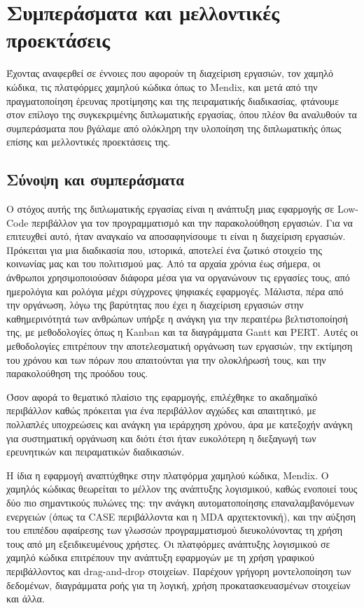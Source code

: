 \chapter{Συμπεράσματα και μελλοντικές προεκτάσεις}
    Έχοντας αναφερθεί σε έννοιες που αφορούν τη διαχείριση εργασιών, τον χαμηλό κώδικα, τις πλατφόρμες χαμηλού κώδικα όπως το Mendix, και μετά από την πραγματοποίηση έρευνας προτίμησης και της πειραματικής διαδικασίας, φτάνουμε στον επίλογο της συγκεκριμένης διπλωματικής εργασίας, όπου πλέον θα αναλυθούν τα συμπεράσματα που βγάλαμε από ολόκληρη την υλοποίηση της διπλωματικής όπως επίσης και μελλοντικές προεκτάσεις της.

    \section{Σύνοψη και συμπεράσματα}
        Ο στόχος αυτής της διπλωματικής εργασίας είναι η ανάπτυξη μιας εφαρμογής σε Low-Code περιβάλλον για τον προγραμματισμό και την παρακολούθηση εργασιών. Για να επιτευχθεί αυτό, ήταν αναγκαίο να αποσαφηνίσουμε τι είναι η διαχείριση εργασιών. Πρόκειται για μια διαδικασία που, ιστορικά, αποτελεί ένα ζωτικό στοιχείο της κοινωνίας μας και του πολιτισμού μας. Από τα αρχαία χρόνια έως σήμερα, οι άνθρωποι χρησιμοποιούσαν διάφορα μέσα για να οργανώνουν τις εργασίες τους, από ημερολόγια και ρολόγια μέχρι σύγχρονες ψηφιακές εφαρμογές. Μάλιστα, πέρα από την οργάνωση, λόγω της βαρύτητας που έχει η διαχείριση εργασιών στην καθημερινότητά των ανθρώπων υπήρξε η ανάγκη για την περαιτέρω βελτιστοποίησή της, με μεθοδολογίες όπως η Kanban και τα διαγράμματα Gantt και PERT. Αυτές οι μεθοδολογίες επιτρέπουν την αποτελεσματική οργάνωση των εργασιών, την εκτίμηση του χρόνου και των πόρων που απαιτούνται για την ολοκλήρωσή τους, και την παρακολούθηση της προόδου τους.

        Όσον αφορά το θεματικό πλαίσιο της εφαρμογής, επιλέχθηκε το ακαδημαϊκό περιβάλλον καθώς πρόκειται για ένα περιβάλλον αγχώδες και απαιτητικό, με πολλαπλές υποχρεώσεις και ανάγκη για ιεράρχηση χρόνου, άρα με κατεξοχήν ανάγκη για συστηματική οργάνωση και διότι έτσι ήταν ευκολότερη η διεξαγωγή των ερευνητικών και πειραματικών διαδικασιών.

        Η ίδια η εφαρμογή αναπτύχθηκε στην πλατφόρμα χαμηλού κώδικα, Mendix. Ο χαμηλός κώδικας θεωρείται το μέλλον της ανάπτυξης λογισμικού, καθώς ενοποιεί τους δύο πιο σημαντικούς πυλώνες της: την ανάγκη αυτοματοποίησης επαναλαμβανόμενων ενεργειών (όπως τα CASE περιβάλλοντα και η MDA αρχιτεκτονική), και την αύξηση του επιπέδου αφαίρεσης των γλωσσών προγραμματισμού διευκολύνοντας τη χρήση τους από μη εξειδικευμένους χρήστες. Οι πλατφόρμες ανάπτυξης λογισμικού σε χαμηλό κώδικα επιτρέπουν την ανάπτυξη εφαρμογών με τη χρήση γραφικού περιβάλλοντος και drag-and-drop στοιχείων. Παρέχουν γρήγορη μοντελοποίηση των δεδομένων, διαγράμματα ροής για τη λογική, χρήση προκατασκευασμένων στοιχείων και άλλα.

